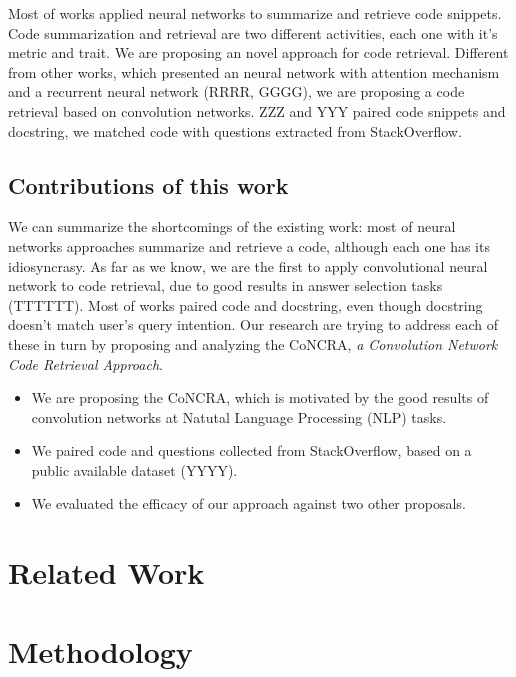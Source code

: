 \documentclass[sigconf]{acmart}
\begin{document}
Most of works applied neural networks to summarize and retrieve code snippets. Code summarization and retrieval are two different activities, each one with it's metric and trait. We are proposing an novel approach for code retrieval. Different from other works, which presented an neural network with attention mechanism and a recurrent neural network (RRRR, GGGG), we are proposing a code retrieval based on convolution networks. ZZZ and YYY paired code snippets and docstring, we matched code with questions extracted from StackOverflow.

\subsection{Contributions of this work}

We can summarize the shortcomings of the existing work:
most of neural networks approaches summarize and retrieve a code, although each one has its idiosyncrasy. As far as we know, we are the first to apply convolutional neural network to code retrieval, due to good results in answer selection tasks (TTTTTT). Most of works paired code and docstring, even though docstring doesn't match user's query intention. Our research are trying to address each of these in turn by proposing and analyzing the CoNCRA, \emph{a Convolution Network Code Retrieval Approach}.

\begin{itemize}
    \item We are proposing the CoNCRA, which is motivated
by the good results of convolution networks at Natutal Language Processing (NLP) tasks. 
    \item We paired code and questions collected from StackOverflow, based on a public available dataset (YYYY).

    \item We evaluated the efficacy of our approach against two other proposals.
    
\end{itemize}



\section{Related Work}



\section{Methodology}
\end{document}
